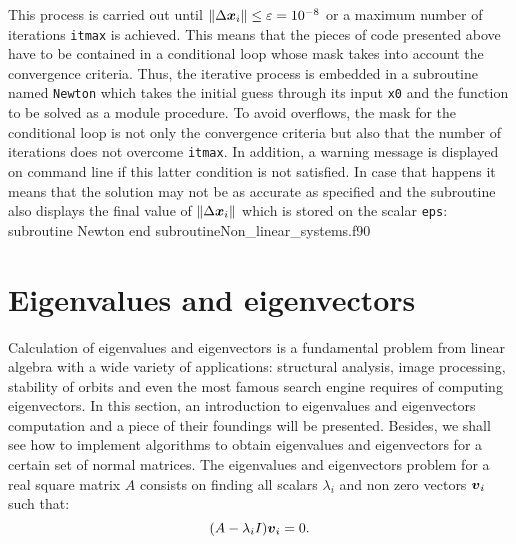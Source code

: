       
      This process is carried out until $\norm{\Delta \boldsymbol{x}_i}\leq\varepsilon=10^{-8}$ or a maximum number of iterations \verb|itmax| is achieved. This means that the pieces of code presented above have to be contained in a conditional loop whose mask takes into account the convergence criteria. Thus, the iterative process is embedded in a subroutine named \verb|Newton| which takes the initial guess through its input \verb|x0| and the function to be solved as a module procedure. To avoid overflows, the mask for the conditional loop is not only the convergence criteria but also that the number of iterations does not overcome \verb|itmax|. In addition, a warning message is displayed on command line if this latter condition is not satisfied. In case that happens it means that the solution may not be as accurate as specified and the subroutine also displays the final value of $\norm{\Delta \boldsymbol{x}_i}$ which is stored on the scalar \verb|eps|:
      \vspace{0.5cm} 
      {subroutine Newton}
      {end subroutine}{Non_linear_systems.f90}
      
      
    
   
   
   
   
   
   
   

     
 \section{Eigenvalues and eigenvectors}
     
     Calculation of eigenvalues and eigenvectors is a fundamental problem from linear algebra with a wide variety of applications: structural analysis, image processing, stability of orbits and even the most famous search engine requires of computing eigenvectors. In this section, an introduction to eigenvalues and eigenvectors computation and a piece of their foundings will be presented. Besides, we shall see how to implement algorithms to obtain eigenvalues and eigenvectors for a certain set of normal matrices. The eigenvalues and eigenvectors problem for a real square matrix $A$ consists on finding all scalars $\lambda_i$ and non zero vectors $\boldsymbol{v}_i$ such that:
     \begin{equation}
     (A-\lambda_i I ) \boldsymbol{v}_i = 0.
     \label{eq:Eigenvalues_problem}
     \end{equation} 
     

